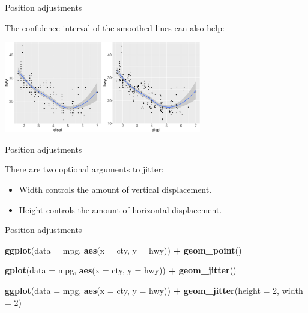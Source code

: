 \documentclass[ignorenonframetext,]{beamer}
\newenvironment{Shaded}{\begin{snugshade}}{\end{snugshade}}
\newcommand{\DataTypeTok}[1]{\textcolor[rgb]{0.13,0.29,0.53}{#1}}
\newcommand{\DecValTok}[1]{\textcolor[rgb]{0.00,0.00,0.81}{#1}}
\newcommand{\KeywordTok}[1]{\textcolor[rgb]{0.13,0.29,0.53}{\textbf{#1}}}
\newcommand{\NormalTok}[1]{#1}
\newcommand{\OperatorTok}[1]{\textcolor[rgb]{0.81,0.36,0.00}{\textbf{#1}}}
\newcommand{\StringTok}[1]{\textcolor[rgb]{0.31,0.60,0.02}{#1}}
\providecommand{\tightlist}{%
  \setlength{\itemsep}{0pt}\setlength{\parskip}{0pt}}
\begin{document}
\begin{frame}{Position adjustments}
\protect\hypertarget{position-adjustments-10}{}

The confidence interval of the smoothed lines can also help:

\begin{center}\includegraphics[height=150px]{data-visualization_files/figure-beamer/unnamed-chunk-133-1} \end{center}

\end{frame}

\begin{frame}{Position adjustments}
\protect\hypertarget{position-adjustments-11}{}

There are two optional arguments to jitter:

\begin{itemize}
\tightlist
\item
  Width controls the amount of vertical displacement.
\item
  Height controls the amount of horizontal displacement.
\end{itemize}

\end{frame}

\begin{frame}[fragile]{Position adjustments}
\protect\hypertarget{position-adjustments-12}{}

\begin{Shaded}
\begin{Highlighting}[]
\KeywordTok{ggplot}\NormalTok{(}\DataTypeTok{data =}\NormalTok{ mpg, }\KeywordTok{aes}\NormalTok{(}\DataTypeTok{x =}\NormalTok{ cty, }\DataTypeTok{y =}\NormalTok{ hwy)) }\OperatorTok{+}
\StringTok{        }\KeywordTok{geom_point}\NormalTok{()}

\KeywordTok{gplot}\NormalTok{(}\DataTypeTok{data =}\NormalTok{ mpg, }\KeywordTok{aes}\NormalTok{(}\DataTypeTok{x =}\NormalTok{ cty, }\DataTypeTok{y =}\NormalTok{ hwy)) }\OperatorTok{+}
\StringTok{        }\KeywordTok{geom_jitter}\NormalTok{()}

\KeywordTok{ggplot}\NormalTok{(}\DataTypeTok{data =}\NormalTok{ mpg, }\KeywordTok{aes}\NormalTok{(}\DataTypeTok{x =}\NormalTok{ cty, }\DataTypeTok{y =}\NormalTok{ hwy)) }\OperatorTok{+}
\StringTok{  }\KeywordTok{geom_jitter}\NormalTok{(}\DataTypeTok{height =} \DecValTok{2}\NormalTok{, }\DataTypeTok{width =} \DecValTok{2}\NormalTok{)}
\end{Highlighting}
\end{Shaded}

\end{frame}
\end{document}
